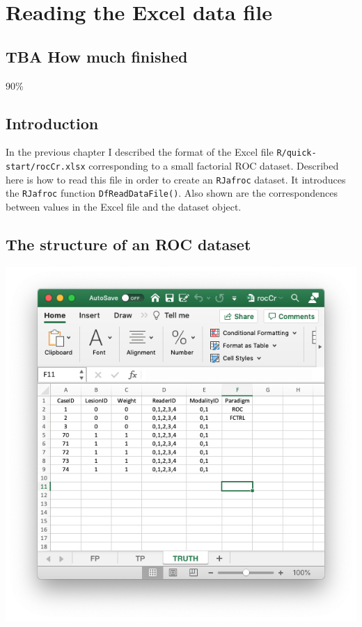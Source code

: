 \documentclass[
]{book}
\begin{document}
\hypertarget{quick-start-read-datafile}{%
\chapter{Reading the Excel data file}\label{quick-start-read-datafile}}

\hypertarget{quick-start-read-datafile-how-much-finished}{%
\section{TBA How much finished}\label{quick-start-read-datafile-how-much-finished}}

90\%

\hypertarget{quick-start-read-datafile-intro}{%
\section{Introduction}\label{quick-start-read-datafile-intro}}

In the previous chapter I described the format of the Excel file \texttt{R/quick-start/rocCr.xlsx} corresponding to a small factorial ROC dataset. Described here is how to read this file in order to create an \texttt{RJafroc} dataset. It introduces the \texttt{RJafroc} function \texttt{DfReadDataFile()}. Also shown are the correspondences between values in the Excel file and the dataset object.

\hypertarget{quick-start-read-datafile-structure-roc-dataset}{%
\section{The structure of an ROC dataset}\label{quick-start-read-datafile-structure-roc-dataset}}

\includegraphics[width=1\textwidth,height=\textheight]{images/quick-start/rocCrTruth.png}
\end{document}
